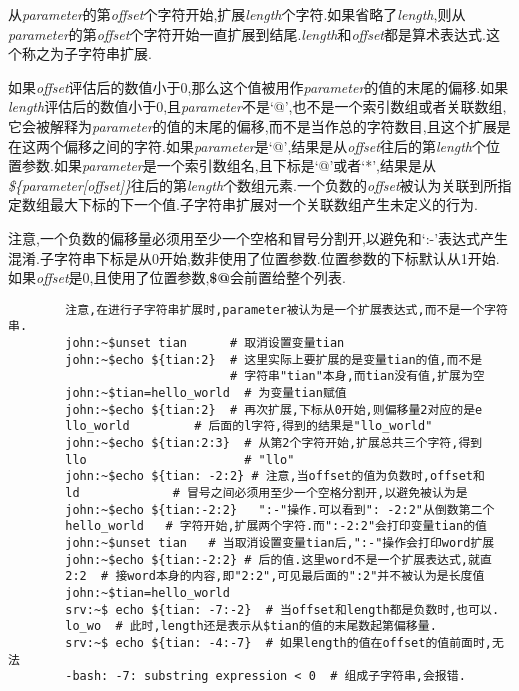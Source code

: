 \documentclass[draft,openany]{book}
\begin{document}
\begin{CJK}{UTF8}{gbsn}
\begin{basedescript}{\desclabelstyle{\nextlinelabel}\desclabelwidth{2.5em}}
        从\emph{parameter}的第\emph{offset}个字符开始,扩展\emph{length}个字符.如果省略了\emph{length},则从\emph{parameter}的第\emph{offset}个字符开始一直扩展到结尾.\emph{length}和\emph{offset}都是算术表达式.这个称之为子字符串扩展.\par
        如果\emph{offset}评估后的数值小于0,那么这个值被用作\emph{parameter}的值的末尾的偏移.如果\emph{length}评估后的数值小于0,且\emph{parameter}不是`@',也不是一个索引数组或者关联数组,它会被解释为\emph{parameter}的值的末尾的偏移,而不是当作总的字符数目,且这个扩展是在这两个偏移之间的字符.如果\emph{parameter}是`@',结果是从\emph{offset}往后的第\emph{length}个位置参数.如果\emph{parameter}是一个索引数组名,且下标是`@'或者`*',结果是从\emph{\$\{parameter[offset]\}}往后的第\emph{length}个数组元素.一个负数的\emph{offset}被认为关联到所指定数组最大下标的下一个值.子字符串扩展对一个关联数组产生未定义的行为.\par
        注意,一个负数的偏移量必须用至少一个空格和冒号分割开,以避免和`:-'表达式产生混淆.子字符串下标是从0开始,数非使用了位置参数.位置参数的下标默认从1开始.如果\emph{offset}是0,且使用了位置参数,\textbf{\$@}会前置给整个列表.
        \begin{verbatim}
        注意,在进行子字符串扩展时,parameter被认为是一个扩展表达式,而不是一个字符串.
        john:~$unset tian      # 取消设置变量tian
        john:~$echo ${tian:2}  # 这里实际上要扩展的是变量tian的值,而不是
                               # 字符串"tian"本身,而tian没有值,扩展为空
        john:~$tian=hello_world  # 为变量tian赋值
        john:~$echo ${tian:2}  # 再次扩展,下标从0开始,则偏移量2对应的是e
        llo_world         # 后面的l字符,得到的结果是"llo_world"
        john:~$echo ${tian:2:3}  # 从第2个字符开始,扩展总共三个字符,得到
        llo                      # "llo"
        john:~$echo ${tian: -2:2} # 注意,当offset的值为负数时,offset和
        ld             # 冒号之间必须用至少一个空格分割开,以避免被认为是
        john:~$echo ${tian:-2:2}   ":-"操作.可以看到": -2:2"从倒数第二个
        hello_world   # 字符开始,扩展两个字符.而":-2:2"会打印变量tian的值
        john:~$unset tian   # 当取消设置变量tian后,":-"操作会打印word扩展
        john:~$echo ${tian:-2:2} # 后的值.这里word不是一个扩展表达式,就直
        2:2  # 接word本身的内容,即"2:2",可见最后面的":2"并不被认为是长度值
        john:~$tian=hello_world
        srv:~$ echo ${tian: -7:-2}  # 当offset和length都是负数时,也可以.
        lo_wo  # 此时,length还是表示从$tian的值的末尾数起第偏移量.
        srv:~$ echo ${tian: -4:-7}  # 如果length的值在offset的值前面时,无法
        -bash: -7: substring expression < 0  # 组成子字符串,会报错.

\end{verbatim}
\end{basedescript}
\end{CJK}
\end{document}

